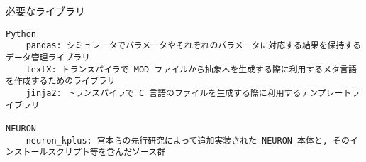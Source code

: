 \begin{table}[htb]
  \caption {必要なライブラリ}
{\footnotesize
\begin{framed}
\begin{verbatim}
Python
    pandas: シミュレータでパラメータやそれぞれのパラメータに対応する結果を保持するデータ管理ライブラリ
    textX: トランスパイラで MOD ファイルから抽象木を生成する際に利用するメタ言語を作成するためのライブラリ
    jinja2: トランスパイラで C 言語のファイルを生成する際に利用するテンプレートライブラリ

NEURON
    neuron_kplus: 宮本らの先行研究によって追加実装された NEURON 本体と, そのインストールスクリプト等を含んだソース群
\end{verbatim}
\end{framed}
}
\end{table}~\\
\vspace{10cm}
{\footnotesize

}

{\footnotesize

}
